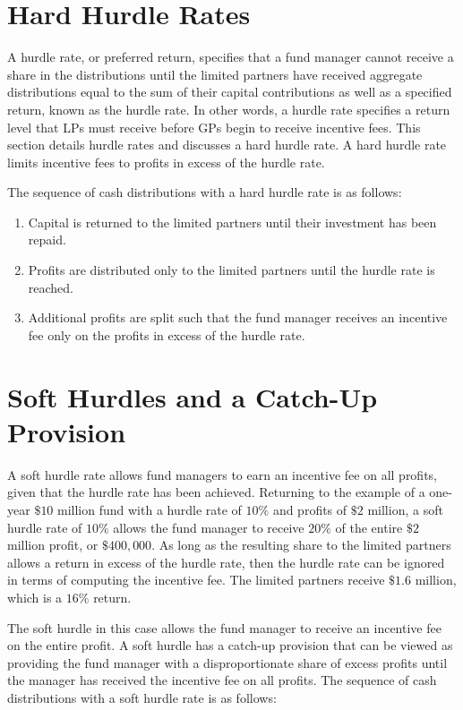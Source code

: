 \documentclass[11pt]{article}
\begin{document}
\section*{Hard Hurdle Rates}
A hurdle rate, or preferred return, specifies that a fund manager cannot receive a share in the distributions until the limited partners have received aggregate distributions equal to the sum of their capital contributions as well as a specified return, known as the hurdle rate. In other words, a hurdle rate specifies a return level that LPs must receive before GPs begin to receive incentive fees. This section details hurdle rates and discusses a hard hurdle rate. A hard hurdle rate limits incentive fees to profits in excess of the hurdle rate.

The sequence of cash distributions with a hard hurdle rate is as follows:

\begin{enumerate}
  \item Capital is returned to the limited partners until their investment has been repaid.

  \item Profits are distributed only to the limited partners until the hurdle rate is reached.

  \item Additional profits are split such that the fund manager receives an incentive fee only on the profits in excess of the hurdle rate.

\end{enumerate}

\section*{Soft Hurdles and a Catch-Up Provision}
A soft hurdle rate allows fund managers to earn an incentive fee on all profits, given that the hurdle rate has been achieved. Returning to the example of a one-year $\$ 10$ million fund with a hurdle rate of $10 \%$ and profits of $\$ 2$ million, a soft hurdle rate of $10 \%$ allows the fund manager to receive $20 \%$ of the entire $\$ 2$ million profit, or $\$ 400,000$. As long as the resulting share to the limited partners allows a return in excess of the hurdle rate, then the hurdle rate can be ignored in terms of computing the incentive fee. The limited partners receive $\$ 1.6$ million, which is a $16 \%$ return.

The soft hurdle in this case allows the fund manager to receive an incentive fee on the entire profit. A soft hurdle has a catch-up provision that can be viewed as providing the fund manager with a disproportionate share of excess profits until the manager has received the incentive fee on all profits. The sequence of cash distributions with a soft hurdle rate is as follows:
\end{document}
